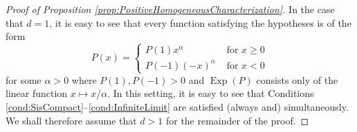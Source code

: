 \documentclass[11pt]{article}
\theoremstyle{remark}
\newcommand\Exp{\operatorname{Exp}}
\begin{document}
\begin{proof}[Proof of Proposition \ref{prop:PositiveHomogeneousCharacterization}]
In the case that $d=1$, it is easy to see that every function satisfying the hypotheses is of the form
\begin{equation*}
P(x)=\begin{cases}
P(1)x^\alpha & \mbox{ for }x\geq 0 \\
P(-1)(-x)^\alpha &\mbox{ for }x<0
\end{cases}
\end{equation*}
for some $\alpha>0$ where $P(1),P(-1)>0$ and $\Exp(P)$ consists only of the linear function $x\mapsto x/\alpha$. In this setting, it is easy to see that Conditions \ref{cond:SisCompact}--\ref{cond:InfiniteLimit} are satisfied (always and) simultaneously. We shall therefore assume that $d>1$ for the remainder of the proof.


\end{proof}
\end{document}
